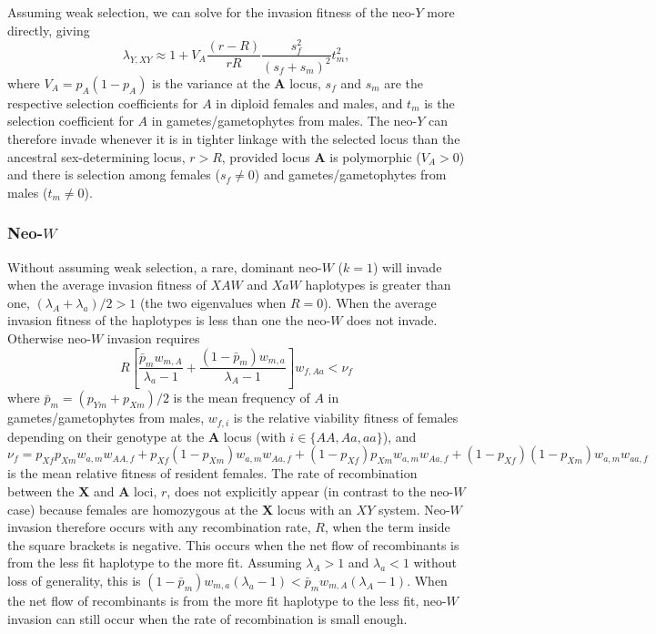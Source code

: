\documentclass[12pt]{article}
\begin{document}
Assuming weak selection, we can solve for the invasion fitness of the neo-$Y$ more directly, giving
\begin{equation}
\lambda_{Y,XY} \approx 1 + V_A \frac{(r - R)}{r R} \frac{s_f^2}{\left( s_f + s_m \right)^2} t_m^2,
\end{equation}
where $V_A = p_A(1-p_A)$ is the variance at the \textbf{A} locus, $s_f$ and $s_m$ are the respective selection coefficients for $A$ in diploid females and males, and $t_m$ is the selection coefficient for $A$ in gametes/gametophytes from males.
The neo-$Y$ can therefore invade whenever it is in tighter linkage with the selected locus than the ancestral sex-determining locus, $r>R$, provided locus \textbf{A} is polymorphic ($V_A>0$) and there is selection among females ($s_f\neq0$) and gametes/gametophytes from males ($t_m\neq0$).

\subsubsection*{Neo-$W$}

Without assuming weak selection, a rare, dominant neo-$W$ ($k=1$) will invade when the average invasion fitness of $XAW$ and $XaW$ haplotypes is greater than one, $(\lambda_A + \lambda_a)/2 > 1$ (the two eigenvalues when $R=0$).
When the average invasion fitness of the haplotypes is less than one the neo-$W$ does not invade.
Otherwise neo-$W$ invasion requires
\begin{equation}
R \left[ \frac{\bar{p}_m w_{m,A}}{\lambda_a - 1} + \frac{(1 - \bar{p}_m) w_{m,a}}{\lambda_A - 1} \right] w_{f,Aa} < \nu_f
\end{equation}
where $\bar{p}_m = (p_{Ym}+p_{Xm}) / 2$ is the mean frequency of $A$ in gametes/gametophytes from males, $w_{f,i}$ is the relative viability fitness of females depending on their genotype at the \textbf{A} locus (with $i\in\{AA,Aa,aa\}$), and 
$\nu_f = 
  p_{Xf} p_{Xm} w_{a,m} w_{AA,f} +
  p_{Xf} (1-p_{Xm}) w_{a,m} w_{Aa,f} +
  (1-p_{Xf}) p_{Xm} w_{a,m} w_{Aa,f} +
  (1-p_{Xf}) (1-p_{Xm}) w_{a, m} w_{aa,f}$
is the mean relative fitness of resident females. 
The rate of recombination between the \textbf{X} and \textbf{A} loci, $r$, does not explicitly appear (in contrast to the neo-$W$ case) because females are homozygous at the \textbf{X} locus with an $XY$ system.
Neo-$W$ invasion therefore occurs with any recombination rate, $R$, when the term inside the square brackets is negative.
This occurs when the net flow of recombinants is from the less fit haplotype to the more fit.
Assuming $\lambda_A>1$ and $\lambda_a<1$ without loss of generality, this is $(1 - \bar{p}_m) w_{m,a} (\lambda_a -1) < \bar{p}_m w_{m,A} (\lambda_A -1)$.
When the net flow of recombinants is from the more fit haplotype to the less fit, neo-$W$ invasion can still occur when the rate of recombination is small enough.
\end{document}
